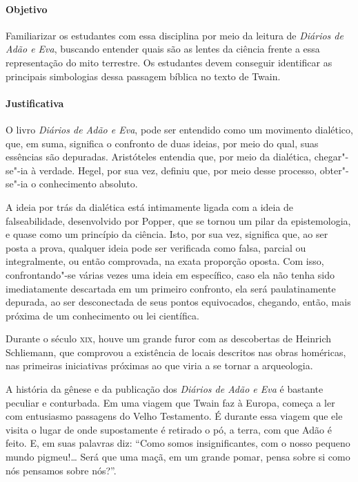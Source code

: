 \documentclass[12pt]{extarticle}
\begin{document}
\paragraph{Objetivo} Familiarizar os estudantes com essa disciplina por meio da leitura 
de \emph{Diários de Adão e Eva}, buscando entender quais são as lentes da ciência frente a 
essa representação do mito terrestre. Os estudantes devem conseguir identificar as principais 
simbologias dessa passagem bíblica no texto de Twain.

\paragraph{Justificativa} O livro \textit{Diários de Adão e Eva}, pode ser entendido como um
movimento dialético, que, em suma, significa o confronto de duas ideias,
por meio do qual, suas essências são depuradas. Aristóteles entendia
que, por meio da dialética, chegar"-se"-ia à verdade. Hegel, por sua vez,
definiu que, por meio desse processo, obter"-se"-ia o conhecimento
absoluto. 

A ideia por trás da dialética está intimamente ligada com a
ideia de falseabilidade, desenvolvido por Popper, que se tornou um pilar
da epistemologia, e quase como um princípio da ciência. Isto, por sua
vez, significa que, ao ser posta a prova, qualquer ideia pode ser
verificada como falsa, parcial ou integralmente, ou então comprovada, na
exata proporção oposta. Com isso, confrontando"-se várias vezes uma ideia
em específico, caso ela não tenha sido imediatamente descartada em um
primeiro confronto, ela será paulatinamente depurada, ao ser
desconectada de seus pontos equivocados, chegando, então, mais próxima
de um conhecimento ou lei científica.

Durante o século \textsc{xix}, houve um grande furor com as descobertas de
Heinrich Schliemann, que comprovou a existência de locais descritos nas
obras homéricas, nas primeiras iniciativas próximas ao que viria a se
tornar a arqueologia. 

A história da gênese e da publicação dos \emph{Diários de Adão
e Eva} é bastante peculiar e conturbada. Em uma viagem que Twain faz à Europa, começa a 
ler com entusiasmo passagens do Velho Testamento. É durante essa viagem que ele visita 
o lugar de onde supostamente é retirado o pó, a terra, com que Adão é feito. E, em suas 
palavras diz: ``Como somos insignificantes, com o nosso pequeno mundo pigmeu!{}\ldots{} 
Será que uma maçã, em um grande pomar, pensa sobre si como nós pensamos sobre nós?''.
\end{document}
